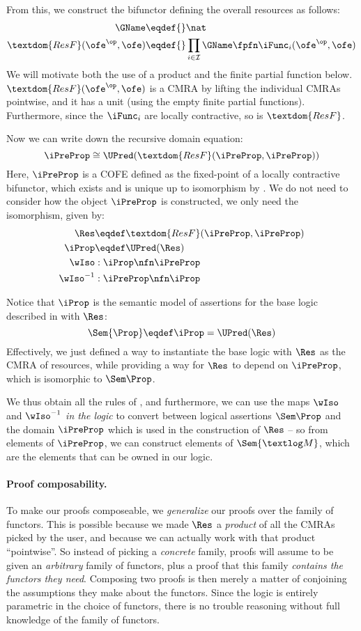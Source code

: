 From this, we construct the bifunctor defining the overall resources as follows:
\begin{align*}
  \GName \eqdef{}& \nat \\
  \textdom{ResF}(\ofe^\op, \ofe) \eqdef{}& \prod_{i \in \mathcal I} \GName \fpfn \iFunc_i(\ofe^\op, \ofe)
\end{align*}
We will motivate both the use of a product and the finite partial function below.
$\textdom{ResF}(\ofe^\op, \ofe)$ is a CMRA by lifting the individual CMRAs pointwise, and it has a unit (using the empty finite partial functions).
Furthermore, since the $\iFunc_i$ are locally contractive, so is $\textdom{ResF}$.

Now we can write down the recursive domain equation:
\[ \iPreProp \cong \UPred(\textdom{ResF}(\iPreProp, \iPreProp)) \]
Here, $\iPreProp$ is a COFE defined as the fixed-point of a locally contractive bifunctor, which exists and is unique up to isomorphism by .
We do not need to consider how the object $\iPreProp$ is constructed, we only need the isomorphism, given by:
\begin{align*}
  \Res &\eqdef \textdom{ResF}(\iPreProp, \iPreProp) \\
  \iProp &\eqdef \UPred(\Res) \\
	\wIso &: \iProp \nfn \iPreProp \\
	\wIso^{-1} &: \iPreProp \nfn \iProp
\end{align*}

Notice that $\iProp$ is the semantic model of assertions for the base logic described in  with $\Res$:
\[ \Sem{\Prop} \eqdef \iProp = \UPred(\Res) \]
Effectively, we just defined a way to instantiate the base logic with $\Res$ as the CMRA of resources, while providing a way for $\Res$ to depend on $\iPreProp$, which is isomorphic to $\Sem\Prop$.

We thus obtain all the rules of , and furthermore, we can use the maps $\wIso$ and $\wIso^{-1}$ \emph{in the logic} to convert between logical assertions $\Sem\Prop$ and the domain $\iPreProp$ which is used in the construction of $\Res$ -- so from elements of $\iPreProp$, we can construct elements of $\Sem{\textlog M}$, which are the elements that can be owned in our logic.

\paragraph{Proof composability.}
To make our proofs composeable, we \emph{generalize} our proofs over the family of functors.
This is possible because we made $\Res$ a \emph{product} of all the CMRAs picked by the user, and because we can actually work with that product ``pointwise''.
So instead of picking a \emph{concrete} family, proofs will assume to be given an \emph{arbitrary} family of functors, plus a proof that this family \emph{contains the functors they need}.
Composing two proofs is then merely a matter of conjoining the assumptions they make about the functors.
Since the logic is entirely parametric in the choice of functors, there is no trouble reasoning without full knowledge of the family of functors.

